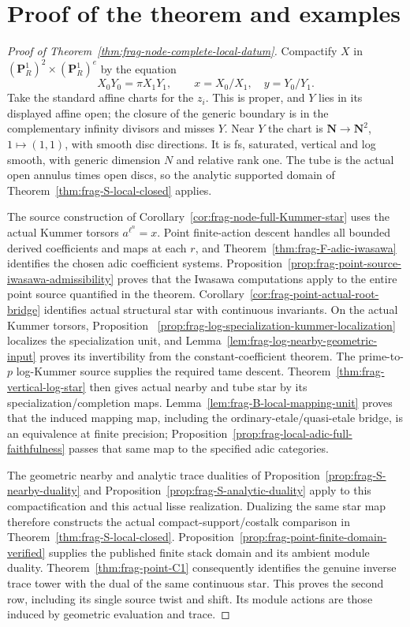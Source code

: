\documentclass[11pt]{article}
\theoremstyle{definition}
\theoremstyle{remark}
\begin{document}
\section{Proof of the theorem and examples}
\label{sec:frag-direct-images}

\begin{proof}[Proof of Theorem~\ref{thm:frag-node-complete-local-datum}]
Compactify
$X$ in $(\mathbf P^1_R)^2\times(\mathbf P^1_R)^e$ by the equation
\[
 X_0Y_0=\pi X_1Y_1,
 \qquad x=X_0/X_1,\quad y=Y_0/Y_1.
\]
Take the standard affine charts for the $z_i$.  This is proper,
and $Y$ lies in its displayed affine open; the closure of the generic
boundary is in the complementary infinity divisors and misses $Y$.
Near $Y$ the chart is $\mathbf N\to\mathbf N^2$,
$1\mapsto(1,1)$, with smooth disc directions.  It is fs, saturated,
vertical and log smooth, with generic dimension $N$ and relative
rank one.  The tube is the actual open annulus times open discs,
so the analytic supported domain of Theorem~\ref{thm:frag-S-local-closed} applies.

The source construction of
Corollary~\ref{cor:frag-node-full-Kummer-star} uses the actual
Kummer torsors $a^{\ell^n}=x$.  Point finite-action descent handles
all bounded derived coefficients and maps at each $r$, and
Theorem~\ref{thm:frag-F-adic-iwasawa} identifies the chosen adic
coefficient systems.  Proposition~\ref{prop:frag-point-source-iwasawa-admissibility}
proves that the Iwasawa computations apply to the entire point
source quantified in the theorem.
Corollary~\ref{cor:frag-point-actual-root-bridge} identifies actual
structural star with continuous invariants.  On the actual Kummer torsors, Proposition~
\ref{prop:frag-log-specialization-kummer-localization} localizes the
specialization unit, and Lemma~\ref{lem:frag-log-nearby-geometric-input}
proves its invertibility from the constant-coefficient theorem.
The prime-to-$p$ log-Kummer source supplies the required tame descent.
Theorem~\ref{thm:frag-vertical-log-star} then gives actual nearby
and tube star by its specialization/completion maps.
Lemma~\ref{lem:frag-B-local-mapping-unit} proves that the induced
mapping map, including the ordinary-etale/quasi-etale bridge, is
an equivalence at finite precision; Proposition~\ref{prop:frag-local-adic-full-faithfulness}
passes that same map to the specified adic categories.

The geometric nearby and analytic trace dualities of Proposition~\ref{prop:frag-S-nearby-duality} and Proposition~\ref{prop:frag-S-analytic-duality}
apply to this compactification and this actual lisse realization.
Dualizing the same star map therefore constructs the actual
compact-support/costalk comparison in Theorem~\ref{thm:frag-S-local-closed}.
Proposition~\ref{prop:frag-point-finite-domain-verified} supplies
the published finite stack domain and its ambient module duality.
Theorem~\ref{thm:frag-point-C1} consequently identifies the genuine inverse trace tower
with the dual of the same continuous star.  This proves the second
row, including its single source twist and shift.  Its module
actions are those induced by geometric evaluation and trace.


\end{proof}
\end{document}
